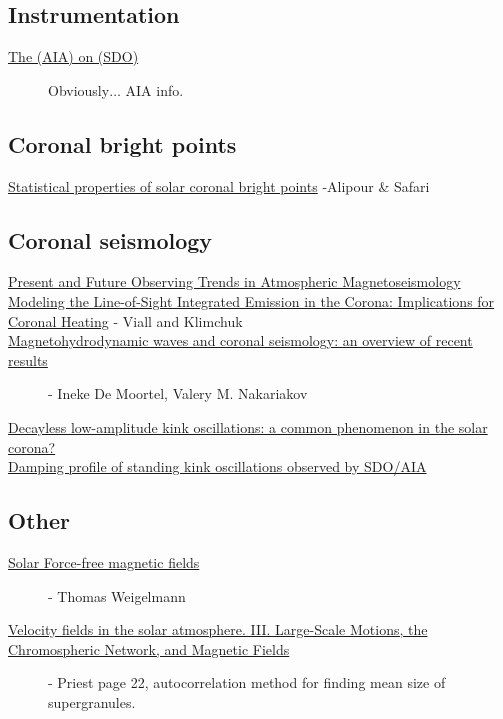 \documentclass{article}
\begin{document}
\subsection{Instrumentation}
\begin{description}
    \item [\href{http://cdsads.u-strasbg.fr/abs/2012SoPh..275...17L}
            {The (AIA) on (SDO)}]
            Obviously$\ldots$ AIA info.
\end{description}

\subsection{Coronal bright points}
\begin{description}
    \item [\href{http://adsabs.harvard.edu/abs/2015ApJ...807..175A}
        {Statistical properties of solar coronal bright points}
        -Alipour \& Safari]
\end{description}

\subsection{Coronal seismology}
\begin{description}
    \item [\href{http://link.springer.com/article/10.1007\%2Fs11207-007-9029-z}
        {Present and Future Observing Trends in Atmospheric Magnetoseismology}]
    \item [\href{http://arxiv.org/abs/1304.5439}
        {Modeling the Line-of-Sight Integrated Emission in the Corona:
        Implications for Coronal Heating}
        - Viall and Klimchuk]
    \item [\href{http://rsta.royalsocietypublishing.org/content/370/1970/3193}
        {Magnetohydrodynamic waves and coronal seismology: an overview of recent results}]
        - Ineke De Moortel, Valery M. Nakariakov
    \item [\href{http://arxiv.org/abs/1509.05519}
        {Decayless low-amplitude kink oscillations: a common phenomenon in the solar corona?}]
    \item [\href{http://adsabs.harvard.edu/abs/2016A\%26A...585L...6P}
        {Damping profile of standing kink oscillations observed by SDO/AIA}]
\end{description}

\subsection{Other}
\begin{description}
    \item [\href{https://arxiv.org/abs/1208.4693}
        {Solar Force-free magnetic fields}]
        - Thomas Weigelmann
    \item [\href{http://cdsads.u-strasbg.fr/abs/1964ApJ...140.1120S}
        {Velocity fields in the solar atmosphere. III.
        Large-Scale Motions, the Chromospheric Network, and Magnetic Fields}]
        - Priest
        page 22, autocorrelation method for finding mean size of supergranules.
\end{description}
\end{document}
